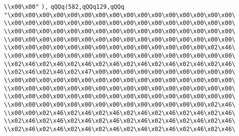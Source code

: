 \verb|\\x00\x00"|\newline
\verb|),|\newline
\verb|qQQq(582,qQQq129,qQQq|\newline
\verb|"\x00\x00\x00\x00\x00\x00\x00\x00\x00\x00\x00\x00\x00\x00\x00\x00\|\newline
\verb|\\x00\x00\x00\x00\x00\x00\x00\x00\x00\x00\x00\x00\x00\x00\x00\x00\|\newline
\verb|\\x00\x00\x00\x00\x00\x00\x00\x00\x00\x00\x00\x00\x00\x00\x00\x00\|\newline
\verb|\\x00\x00\x00\x00\x00\x00\x00\x00\x00\x00\x00\x00\x00\x00\x00\x00\|\newline
\verb|\\x00\x00\x00\x00\x00\x00\x00\x00\x00\x00\x00\x00\x00\x00\x02\x46\|\newline
\verb|\\x00\x00\x00\x00\x00\x00\x00\x00\x00\x00\x00\x00\x00\x00\x00\x00\|\newline
\verb|\\x02\x46\x02\x46\x02\x46\x02\x46\x02\x46\x02\x46\x02\x46\x02\x46\|\newline
\verb|\\x02\x46\x02\x46\x02\x47\x00\x00\x00\x00\x00\x00\x00\x00\x00\x00\|\newline
\verb|\\x00\x00\x00\x00\x00\x00\x00\x00\x00\x00\x00\x00\x00\x00\x00\x00\|\newline
\verb|\\x00\x00\x00\x00\x00\x00\x00\x00\x00\x00\x00\x00\x00\x00\x00\x00\|\newline
\verb|\\x00\x00\x00\x00\x00\x00\x00\x00\x00\x00\x00\x00\x00\x00\x00\x00\|\newline
\verb|\\x00\x00\x00\x00\x00\x00\x00\x00\x00\x00\x00\x00\x00\x00\x02\x46\|\newline
\verb|\\x00\x00\x02\x46\x02\x46\x02\x46\x02\x46\x02\x46\x02\x46\x02\x46\|\newline
\verb|\\x02\x46\x02\x46\x02\x46\x02\x46\x02\x46\x02\x46\x02\x46\x02\x46\|\newline
\verb|\\x02\x46\x02\x46\x02\x46\x02\x46\x02\x46\x02\x46\x02\x46\x02\x46\|\newline
